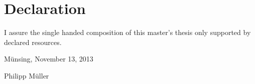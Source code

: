 
\null
\vfill

\section*{Declaration}

\noindent I assure the single handed composition of this master's thesis only supported by declared resources.

\vspace{0.5cm} \noindent Münsing, November 13, 2013

\vspace{1cm} \noindent Philipp Müller

\newpage{}

